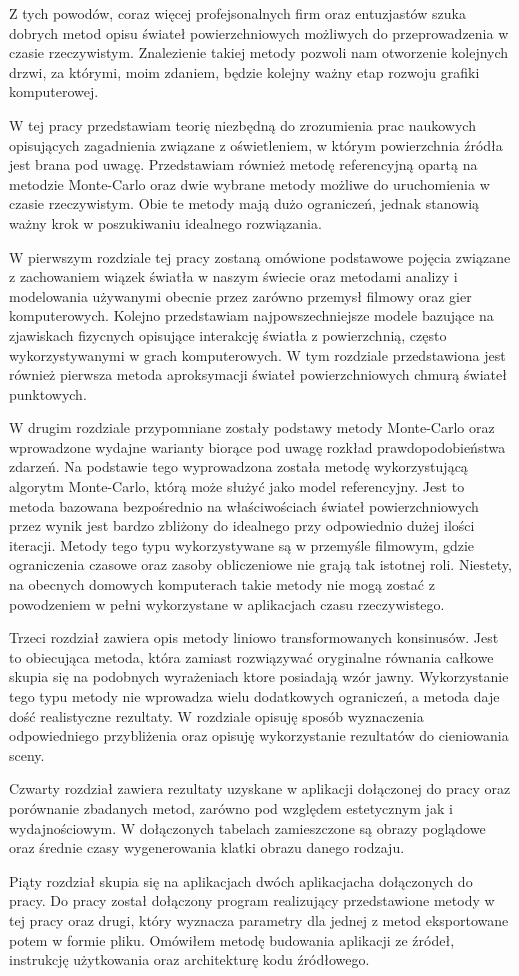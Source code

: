 \documentclass[../main.tex]{subfiles}
\begin{document}
Z tych powodów, coraz więcej profejsonalnych firm oraz entuzjastów szuka dobrych metod opisu świateł powierzchniowych możliwych do przeprowadzenia w czasie rzeczywistym. Znalezienie takiej metody pozwoli nam otworzenie kolejnych drzwi, za którymi, moim zdaniem, będzie kolejny ważny etap rozwoju grafiki komputerowej.

W tej pracy przedstawiam teorię niezbędną do zrozumienia prac naukowych opisujących zagadnienia związane z oświetleniem, w którym powierzchnia źródła jest brana pod uwagę. Przedstawiam również metodę referencyjną opartą na metodzie Monte-Carlo oraz dwie wybrane metody możliwe do uruchomienia w czasie rzeczywistym. Obie te metody mają dużo ograniczeń, jednak stanowią ważny krok w poszukiwaniu idealnego rozwiązania.

W pierwszym rozdziale tej pracy zostaną omówione podstawowe pojęcia związane z zachowaniem wiązek światła w naszym świecie oraz metodami analizy i modelowania używanymi obecnie przez zarówno przemysł filmowy oraz gier komputerowych. Kolejno przedstawiam najpowszechniejsze modele bazujące na zjawiskach fizycnych opisujące interakcję światła z powierzchnią, często wykorzystywanymi w grach komputerowych. W tym rozdziale przedstawiona jest również pierwsza metoda aproksymacji świateł powierzchniowych chmurą świateł punktowych.

W drugim rozdziale przypomniane zostały podstawy metody Monte-Carlo oraz wprowadzone wydajne warianty biorące pod uwagę rozkład prawdopodobieństwa zdarzeń. Na podstawie tego wyprowadzona została metodę wykorzystującą algorytm Monte-Carlo, którą może służyć jako model referencyjny. Jest to metoda bazowana bezpośrednio na właściwościach świateł powierzchniowych przez wynik jest bardzo zbliżony do idealnego przy odpowiednio dużej ilości iteracji. Metody tego typu wykorzystywane są w przemyśle filmowym, gdzie ograniczenia czasowe oraz zasoby obliczeniowe nie grają tak istotnej roli. Niestety, na obecnych domowych komputerach takie metody nie mogą zostać z powodzeniem w pełni wykorzystane w aplikacjach czasu rzeczywistego.

Trzeci rozdział zawiera opis metody liniowo transformowanych konsinusów. Jest to obiecująca metoda, która zamiast rozwiązywać oryginalne równania całkowe skupia się na podobnych wyrażeniach ktore posiadają wzór jawny. Wykorzystanie tego typu metody nie wprowadza wielu dodatkowych ograniczeń, a metoda daje dość realistyczne rezultaty. W rozdziale opisuję sposób wyznaczenia odpowiedniego przybliżenia oraz opisuję wykorzystanie rezultatów do cieniowania sceny.

Czwarty rozdział zawiera rezultaty uzyskane w aplikacji dołączonej do pracy oraz porównanie zbadanych metod, zarówno pod względem estetycznym jak i wydajnościowym. W dołączonych tabelach zamieszczone są obrazy poglądowe oraz średnie czasy wygenerowania klatki obrazu danego rodzaju.

Piąty rozdział skupia się na aplikacjach dwóch aplikacjacha dołączonych do pracy. Do pracy został dołączony program realizujący przedstawione metody w tej pracy oraz drugi, który wyznacza parametry dla jednej z metod eksportowane potem w formie pliku. Omówiłem metodę budowania aplikacji ze źródeł, instrukcję użytkowania oraz architekturę kodu źródłowego.
\end{document}
